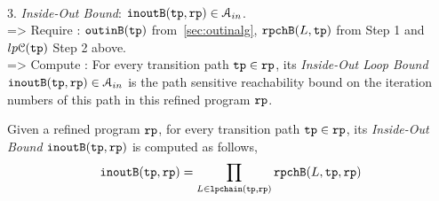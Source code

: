 %
\\
3. \emph{Inside-Out Bound}: ${\mathtt{inoutB}}({\mathtt{tp}}, {\mathtt{rp}}) \in \mathcal{A}_{in}$.
\\
=> Require :
${\mathtt{outinB}}({\mathtt{tp}})$ from~\ref{sec:outinalg}, ${\mathtt{rpchB}}(L, {\mathtt{tp}})$ from Step 1 and 
$lp\mathcal{C}({\mathtt{tp}})$
Step 2 above.
\\
=> Compute : 
For every transition path ${\mathtt{tp}} \in {\mathtt{rp}}$, its \emph{Inside-Out Loop Bound}
 ${\mathtt{inoutB}}({\mathtt{tp}}, {\mathtt{rp}}) \in \mathcal{A}_{in}$ is 
the path sensitive reachability bound on the iteration numbers of this path in this refined program ${\mathtt{rp}}$. 
%
\begin{defn}
  \label{def:outin_bound}
  Given a refined program ${\mathtt{rp}}$, for every transition path ${\mathtt{tp}} \in {\mathtt{rp}}$, 
  its \emph{Inside-Out Bound}
  ${\mathtt{inoutB}}({\mathtt{tp}}, {\mathtt{rp}})$ is 
 computed as follows,
\[
  {\mathtt{inoutB}}({\mathtt{tp}}, {\mathtt{rp}}) =
  \prod\limits_{L \in {\mathtt{lpchain}}({\mathtt{tp}}, {\mathtt{rp}})} {\mathtt{rpchB}}(L, {\mathtt{tp}}, {\mathtt{rp}})
  \]
\end{defn}
